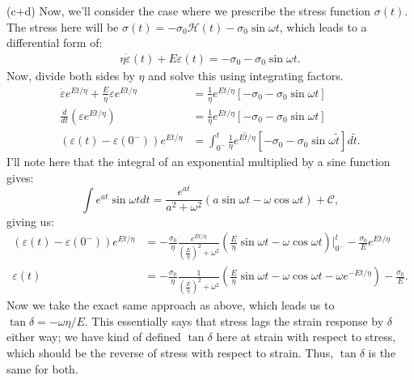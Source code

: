 (c+d) Now, we'll consider the case where we prescribe the stress function $\sigma(t)$. 
The stress here will be $\sigma(t) = -\sigma_0 \mathcal{H}(t) - \sigma_0 \sin \omega t$, which leads to a differential form of: 
\begin{align*}
     \eta \dot{\varepsilon}(t) + E \varepsilon(t) = -\sigma_0  - \sigma_0 \sin \omega t. 
\end{align*}
Now, divide both sides by $\eta$ and solve this using integrating factors.
\begin{align*}
    \dot{\varepsilon} e^{E t/\eta} + \frac{E}{\eta}\varepsilon e^{E t/\eta} &= \frac{1}{\eta}e^{Et/\eta}\left[-\sigma_0 - \sigma_0 \sin \omega t\right]\\
    \frac{d}{dt}\left( \varepsilon e^{Et/\eta} \right) &= \frac{1}{\eta}e^{Et/\eta}\left[-\sigma_0 - \sigma_0 \sin \omega t\right]\\
    (\varepsilon(t) - \varepsilon(0^-))e^{Et/\eta} &= \int_{0^-}^t \frac{1}{\eta}e^{E\tilde{t}/\eta}\left[-\sigma_0 - \sigma_0 \sin \omega \tilde{t}\right] d\tilde{t}.
\end{align*}
I'll note here that the integral of an exponential multiplied by a sine function gives:
\begin{equation*}
    \int e^{at} \sin \omega t dt = \frac{e^{at}}{a^2 + \omega^2}(a \sin \omega t - \omega \cos \omega t) + \mathcal{C},
\end{equation*}
giving us:
\begin{align*}
 (\varepsilon(t) - \varepsilon(0^-))e^{Et/\eta} &= -\frac{\sigma_0}{\eta} \frac{e^{Et/\eta}}{\left( \frac{E}{\eta}\right)^2 + \omega^2}\left(\frac{E}{\eta} \sin \omega t - \omega \cos \omega t\right)\Bigg|_{0^-}^t - \frac{\sigma_0}{E} e^{Et/\eta}\\
 \varepsilon(t) &= -\frac{\sigma_0}{\eta} \frac{1}{\left( \frac{E}{\eta}\right)^2 + \omega^2}\left(\frac{E}{\eta} \sin \omega t - \omega \cos \omega t - \omega e^{-Et/\eta}\right)  - \frac{\sigma_0}{E}. 
\end{align*}
Now we take the exact same approach as above, which leads us to $\tan \delta = -\omega\eta/E$. 
This essentially says that stress lags the strain response by $\delta$ either way; we have kind of defined $\tan \delta$ here at strain with respect to stress, which should be the reverse of stress with respect to strain. 
Thus, $\tan \delta$ is the same for both.

